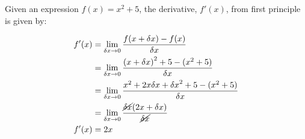 Given an expression \( f(x) = x^2+5 \), the derivative, \( f'(x) \), from first principle is given by:

\begin{align}
    f'(x) &= \lim_{\delta x \to 0}
        \frac{
            f(x + \delta x) - f(x)
        }{ \delta x }
    \\
    &= \lim_{\delta x \to 0}
        \frac{
            {(x + \delta x)}^2+5 - (x^2+5)
        }{ \delta x }
    \nonumber \\
    &= \lim_{\delta x \to 0}
        \frac{
            x^2 + 2x\delta x + {\delta x}^2 +5 - (x^2+5)
        }{ \delta x }
    \nonumber \\
    &= \lim_{\delta x \to 0}
        \frac{
            \cancel{\delta x} (2x + \delta x)
        }{ \cancel{\delta x} }
    \nonumber \\
    f'(x) &= 2x 
\end{align}
